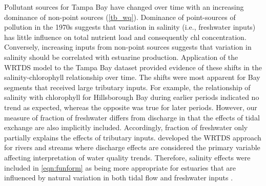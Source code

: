 \documentclass[letterpaper,12pt,oneside]{article}\usepackage{graphicx, color}
\begin{document}
Pollutant sources for Tampa Bay have changed over time with an increasing dominance of non-point sources (\cref{tb_wq}).  Dominance of point-sources of pollution in the 1970s suggests that variation in salinity (i.e., freshwater inputs) has little influence on total nutrient load and consequently \ac{chl} concentration.   Conversely, increasing inputs from non-point sources suggests that variation in salinity should be correlated with estuarine production.  Application of the \ac{WRTDS} model to the Tampa Bay dataset provided evidence of these shifts in the salinity-chlorophyll relationship over time.  The shifts were most apparent for Bay segments that received large tributary inputs. For example, the relationship of salinity with chlorophyll for Hillsborough Bay during earlier periods indicated no trend as expected, whereas the opposite was true for later periods.  However, our measure of fraction of freshwater differs from discharge in that the effects of tidal exchange are also implicitly included.  Accordingly, fraction of freshwater only partially explains the effects of tributary inputs.  \citet{Hirsch10} developed the \ac{WRTDS} approach for rivers and streams where discharge effects are considered the primary variable affecting interpretation of water quality trends.  Therefore, salinity effects were included in \cref{eqn:funform} as being more appropriate for estuaries that are influenced by natural variation in both tidal flow and freshwater inputs \citep{Cloern96}.
\end{document}
